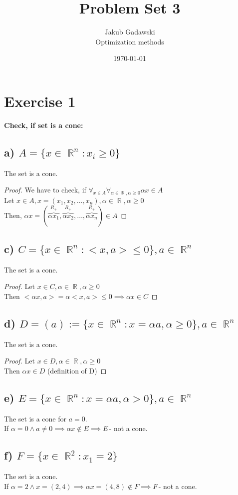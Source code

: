 \documentclass[12pt]{article}
\title{Problem Set 3}
\author{Jakub Gadawski\\ 
Optimization methods
}
\date{\today}
\DeclareMathOperator{\R}{\mathbb{R}}
\begin{document}
\setlength{\droptitle}{-5em}
\maketitle

\section*{Exercise 1}
{\bfseries Check, if set is a cone:}
\subsection*{a) \(A=\{x \in \R^n : x_i \geq 0\} \)}
The set is a cone.
\begin{proof}
    We have to check, if \(\forall_{x\in A}\forall_{\alpha \in \R, \alpha \geq 0} \alpha x \in A\)\\
    Let \(x\in A, x=(x_1, x_2, \ldots, x_n), \alpha \in \R, \alpha \geq 0\)\\
    Then, \( \alpha x = (\overbrace{\alpha x_1}^{R_+}, \overbrace{\alpha x_2}^{R_+}, \ldots, \overbrace{\alpha x_n}^{R_+}) \in A \)
\end{proof}
\subsection*{c) \( C=\{ x \in \R^n:<x, a> \leq 0\}, a\in \R^n\)}
The set is a cone.
\begin{proof}
    Let \( x \in C, \alpha \in \R, \alpha \geq 0\)\\
    Then \( <\alpha x, a>=\alpha <x, a> \leq 0 \implies \alpha x \in C \)
\end{proof}
\subsection*{d) \(D=(a):=\{x \in \R^n : x=\alpha a, \alpha \geq 0\}, a \in \R^n\) }
The set is a cone. 
\begin{proof}
    Let \( x \in D, \alpha \in \R, \alpha \geq 0 \)\\
    Then \(\alpha x \in D\) (definition of D)
\end{proof}
\subsection*{e) \(E=\{x \in \R^n : x=\alpha a, \alpha > 0\}, a \in \R^n\) }
The set is a cone for \(a=0\).\\
If \(\alpha = 0 \land a \ne 0 \implies \alpha x \notin E \implies E\,\)- not a cone.
\subsection*{f) \(F=\{x \in \R^2 : x_1=2\}\) }
The set is a cone.\\
If \(\alpha = 2 \land x = (2,4) \implies \alpha x=(4, 8) \notin F\implies F\,\)- not a cone.
\end{document}

